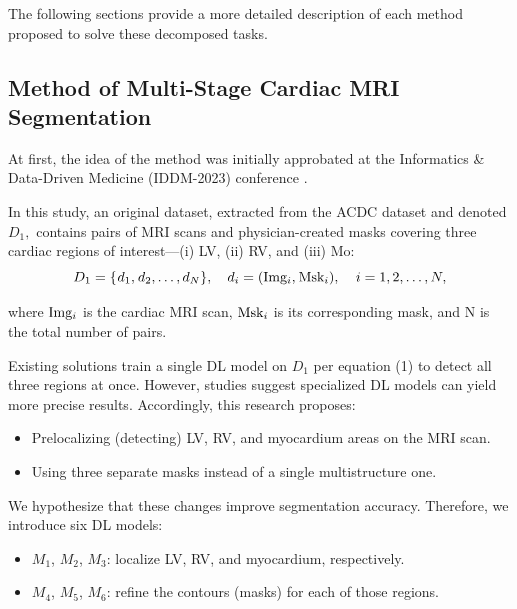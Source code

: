 \documentclass[fleqn,10pt]{wlscirep}
\begin{document}
The following sections provide a more detailed description of each method proposed to solve these decomposed tasks.

\subsection*{Method of Multi-Stage Cardiac MRI Segmentation}

At first, the idea of the method was initially approbated at the Informatics \& Data-Driven Medicine (IDDM-2023) conference \cite{Slobodzian:2024}.

In this study, an original dataset, extracted from the ACDC dataset and denoted \({D_1},\) contains pairs of MRI scans and physician-created masks covering three cardiac regions of interest—(i) LV, (ii) RV, and (iii) Mo:
\begin{equation}
    {D_1} = \{ {\mkern 1mu} {d_1},{\mkern 1mu} {d_2}, \ldots ,{d_N}\} ,\quad {d_i} = ({\rm{Im}}{{\rm{g}}_i},{\mkern 1mu} {\rm{Ms}}{{\rm{k}}_i}),\quad {\kern 1pt} i = 1,2, \ldots ,N,
\end{equation}

where \({\rm{Im}}{{\rm{g}}_i}\) is the cardiac MRI scan, \({\rm{Ms}}{{\rm{k}}_i}\) is its corresponding mask, and N is the total number of pairs.

Existing solutions train a single DL model on \({D_1}\) per equation (1) to detect all three regions at once. However, studies \cite{Wehbe:2023,Pandey:2023} suggest specialized DL models can yield more precise results. Accordingly, this research proposes:

\begin{itemize}
    \item Prelocalizing (detecting) LV, RV, and myocardium areas on the MRI scan.
    \item Using three separate masks instead of a single multistructure one.
\end{itemize}

We hypothesize that these changes improve segmentation accuracy. Therefore, we introduce six DL models:

\begin{itemize}
    \item \({M_1}\), \({M_2}\), \({M_3}\): localize LV, RV, and myocardium, respectively.
    \item \({M_4}\), \({M_5}\), \({M_6}\): refine the contours (masks) for each of those regions.
\end{itemize}
\end{document}

